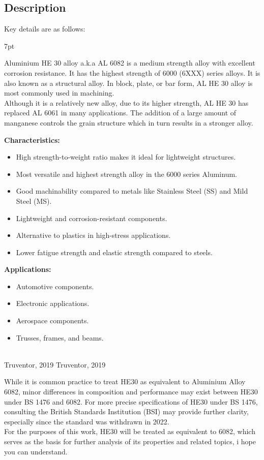 \documentclass{article}
\newcommand{\formalsource}{} %
\newenvironment{formal}[1][]{%
    \renewcommand{\formalsource}{#1}%
    \def\FrameCommand{%
        \hspace{1pt}%
        {\color{darkblue}\vrule width 2pt}%
        {\color{formalshade}\vrule width 4pt}%
        \colorbox{formalshade}%
    }%
    \MakeFramed{\advance\hsize-\width\FrameRestore}%
    \noindent\hspace{-4.55pt}%
    \begin{adjustwidth}{}{7pt}%
        \vspace{2pt}%
    }%
    {%
        \vspace{2pt}%
        \ifx\formalsource\empty %
        \else
        \hfill{\footnotesize{\formalsource}}%
        \fi
    \end{adjustwidth}\endMakeFramed%
}
\begin{document}
\subsection{Description}
Key details are as follows:
\begin{formal}[Truventor, 2019]
Aluminium HE 30 alloy a.k.a AL 6082 is a medium strength alloy with excellent corrosion resistance. It
has the highest strength of 6000 (6XXX) series alloys. It is also known as a structural alloy. In block,
plate, or bar form, AL HE 30 alloy is most commonly used in machining.\\[8pt]
Although it is a relatively new alloy, due to its higher strength, AL HE 30 has replaced AL 6061 in many
applications. The addition of a large amount of manganese controls the grain structure which in turn
results in a stronger alloy.\\[8pt]
\begin{minipage}[t]{0.57\textwidth}
    \textbf{Characteristics:}
    \begin{itemize}[itemsep=-1mm]
    \item High strength-to-weight ratio makes it ideal for lightweight structures.
    \item Most versatile and highest strength alloy in the 6000 series Aluminum.
    \item Good machinability compared to metals like Stainless Steel (SS) and Mild Steel (MS).
    \item Lightweight and corrosion-resistant components.
    \item Alternative to plastics in high-stress applications.
    \item Lower fatigue strength and elastic strength compared to steels.
\end{itemize}
\end{minipage}\hspace{2.4em}
\begin{minipage}[t]{0.45\textwidth}
\textbf{Applications:}
\begin{itemize}[itemsep=-1mm]
    \item Automotive components.
    \item Electronic applications.
    \item Aerospace components.
    \item Trusses, frames, and beams.
\end{itemize}
\end{minipage}\\
\vspace{1pt}
\end{formal}
\newpage\noindent
While it is common practice to treat HE30 as equivalent to Aluminium Alloy 6082, minor differences in composition and performance may exist between HE30 under BS 1476 and 6082. For more precise specifications of HE30 under BS 1476, consulting the British Standards Institution (BSI) may provide further clarity, especially since the standard was withdrawn in 2022.\\[1em]
For the purposes of this work, HE30 will be treated as equivalent to 6082, which serves as the basis for further analysis of its properties and related topics, i hope you can understand.
\end{document}
